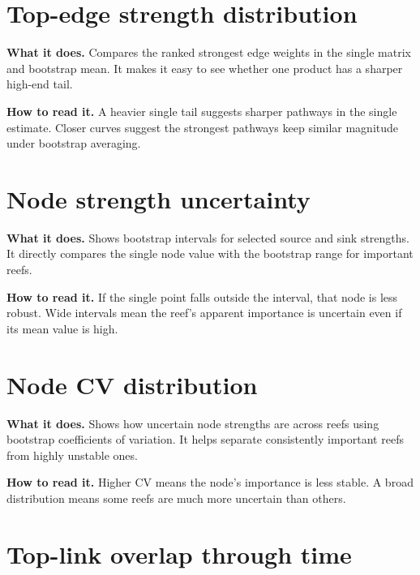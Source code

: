 \documentclass[11pt,a4paper]{article}
\begin{document}
\section{Top-edge strength distribution}

\textbf{What it does.} Compares the ranked strongest edge weights in the single matrix and bootstrap mean.
It makes it easy to see whether one product has a sharper high-end tail.


\textbf{How to read it.} A heavier single tail suggests sharper pathways in the single estimate.
Closer curves suggest the strongest pathways keep similar magnitude under bootstrap averaging.

\section{Node strength uncertainty}

\textbf{What it does.} Shows bootstrap intervals for selected source and sink strengths.
It directly compares the single node value with the bootstrap range for important reefs.


\textbf{How to read it.} If the single point falls outside the interval, that node is less robust.
Wide intervals mean the reef's apparent importance is uncertain even if its mean value is high.

\section{Node CV distribution}

\textbf{What it does.} Shows how uncertain node strengths are across reefs using bootstrap coefficients of variation.
It helps separate consistently important reefs from highly unstable ones.


\textbf{How to read it.} Higher CV means the node's importance is less stable.
A broad distribution means some reefs are much more uncertain than others.

\section{Top-link overlap through time}
\end{document}
